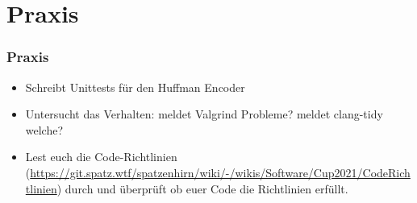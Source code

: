 \documentclass[aspectratio=169]{beamer}
\begin{document}
\section{Praxis}
\begin{frame}
    \frametitle{Praxis}
    \begin{itemize}
        \item Schreibt Unittests für den Huffman Encoder
            \pause
        \item Untersucht das Verhalten: meldet Valgrind Probleme? meldet clang-tidy welche?
            \pause
        \item Lest euch die Code-Richtlinien (\url{https://git.spatz.wtf/spatzenhirn/wiki/-/wikis/Software/Cup2021/CodeRichtlinien}) durch und überprüft ob euer Code die Richtlinien erfüllt.
    \end{itemize}
\end{frame}
\end{document}
